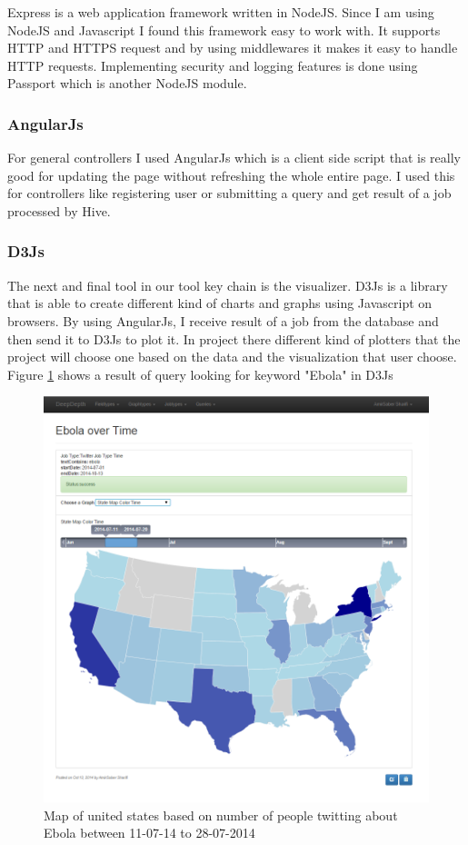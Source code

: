 \documentclass[a4paper,11pt]{report}
\begin{document}
Express is a web application framework written in NodeJS. Since I am using NodeJS and Javascript I found this framework easy to work with. It supports HTTP and HTTPS request and by using middlewares it makes it easy to handle HTTP requests. Implementing security and logging features is done using Passport which is another NodeJS module.

\subsubsection{AngularJs}

For general controllers I used AngularJs which is a client side script that is really good for updating the page without refreshing the whole entire page. I used this for controllers like registering user or submitting a query and get result of a job processed by Hive.

\subsubsection{D3Js}

The next and final tool in our tool key chain is the visualizer. D3Js is a library that is able to create different kind of charts and graphs using Javascript on browsers. By using AngularJs, I receive result of a job from the database and then send it to D3Js to plot it. In project there different kind of plotters that the project will choose one based on the data and the visualization that user choose. Figure \ref{fig:d3usanewmexico} shows a result of query looking for keyword "Ebola" in D3Js

\begin{figure}[!hbp]
\begin{center}
\includegraphics[scale=0.5]{map.png}
\end{center}
\caption{Map of united states based on number of people twitting about Ebola between 11-07-14 to 28-07-2014}
\label{fig:d3usanewmexico}
\end{figure}
\end{document}
